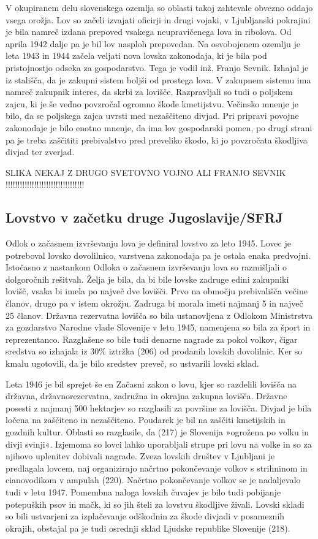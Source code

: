 \documentclass[a4paper,12pt,openright]{book}
\begin{document}
V okupiranem delu slovenskega ozemlja so oblasti takoj zahtevale obvezno oddajo vsega orožja. 
Lov so začeli izvajati oficirji in drugi vojaki, v Ljubljanski pokrajini je bila namreč izdana prepoved vsakega neupravičenega lova in ribolova. 
Od aprila 1942 dalje pa je bil lov nasploh prepovedan. 
Na osvobojenem ozemlju je leta 1943 in 1944 začela veljati nova lovska zakonodaja, ki je bila pod pristojnostjo odseka za gospodarstvo. 
Tega je vodil inž. Franjo Sevnik. Izhajal je iz stališča, da je zakupni sistem boljši od prostega lova. 
V zakupnem sistemu ima namreč zakupnik interes, da skrbi za lovišče. 
Razpravljali so tudi o poljskem zajcu, ki je še vedno povzročal ogromno škode kmetijstvu. 
Večinsko mnenje je bilo, da se poljskega zajca uvrsti med nezaščiteno divjad.
Pri pripravi povojne zakonodaje je bilo enotno mnenje, da ima lov gospodarski pomen, po drugi strani pa je treba zaščititi prebivalstvo pred preveliko škodo, ki jo povzročata škodljiva divjad ter zverjad. 

SLIKA NEKAJ Z DRUGO SVETOVNO VOJNO ALI FRANJO SEVNIK !!!!!!!!!!!!!!!!!!!!!!!!!!!!!!!!!

\subsection{Lovstvo v začetku druge Jugoslavije/SFRJ}

Odlok o začasnem izvrševanju lova je definiral lovstvo za leto 1945. 
Lovec je potreboval lovsko dovolilnico, varstvena zakonodaja pa je ostala enaka predvojni.
Istočasno z nastankom Odloka o začasnem izvrševanju lova so razmišljali o dolgoročnih rešitvah.
Želja je bila, da bi bile lovske zadruge edini zakupniki lovišč, vsaka bi imela po največ dve lovišči. 
Prvo na območju prebivališča večine članov, drugo pa v istem okrožju.
Zadruga bi morala imeti najmanj 5 in največ 25 članov.
Državna rezervatna lovišča so bila ustanovljena z Odlokom Ministrstva za gozdarstvo Narodne vlade Slovenije v letu 1945, namenjena so bila za šport in reprezentanco.
Razglašene so bile tudi denarne nagrade za pokol volkov, čigar sredstva so izhajala iz 30\% iztržka (206) od prodanih lovskih dovolilnic. 
Ker so kmalu ugotovili, da je bilo sredstev preveč, so ustvarili lovski sklad.

Leta 1946 je bil sprejet še en Začasni zakon o lovu, kjer so razdelili lovišča na državna, državnorezervatna, zadružna in okrajna zakupna lovišča. 
Državne posesti z najmanj 500 hektarjev so razglasili za površine za lovišča. 
Divjad je bila ločena na zaščiteno in nezaščiteno. 
Poudarek je bil na zaščiti kmetijskih in gozdnih kultur. 
Oblasti so razglasile, da (217) je Slovenija »ogrožena po volku in divji svinji«. 
Izjemoma so lovci lahko uporabljali strupe pri lovu na volke in so za njihovo uplenitev dobivali nagrade. 
Zveza lovskih društev v Ljubljani je predlagala lovcem, naj organizirajo načrtno pokončevanje volkov s strihninom in cianovodikom v ampulah (220). 
Načrtno pokončevanje volkov se je nadaljevalo tudi v letu 1947. 
Pomembna naloga lovskih čuvajev je bilo tudi pobijanje potepuških psov in mačk, ki so jih šteli za lovstvu škodljive živali. 
Lovski skladi so bili ustvarjeni za izplačevanje odškodnin za škode divjadi v posameznih okrajih, obstajal pa je tudi osrednji sklad Ljudske republike Slovenije (218).
\end{document}
